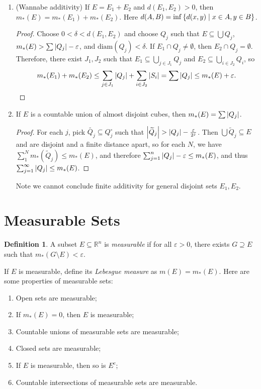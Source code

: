 \documentclass[leqno, openany]{memoir}
\theoremstyle{definition}
\newtheorem{defn}[thm]{Definition}
\theoremstyle{remark}
\theoremstyle{plain}
\theoremstyle{definition}
\theoremstyle{remark}
\newcommand{\R}{\mathbb{R}}
\newcommand{\ep}{\varepsilon}
\newcommand{\mr}[1]{\mathrm{#1}}
\newcommand{\wt}[1]{\widetilde{#1}}
\begin{document}
\begin{enumerate}
\begin{proof}
            Now $E \subseteq \bigcup G_j$ and $G = \bigcup G_j$, so 
            \[ m_*(G) \leq \sum \qty(\abs{Q_j} + \frac{\ep}{2^j}) \leq \sum \abs{Q_j} + \ep \leq m_*(E) + 2 \ep. \qedhere \]
        \end{proof}
    \item (Wannabe additivity) If $E = E_1 + E_2$ and $d(E_1, E_2) > 0$, then $m_*(E) = m_*(E_1) + m_*(E_2)$. Here $d(A,B) = \inf \qty{d(x,y) \mid x \in A, y \in B}$.
        \begin{proof}
            Choose $0 < \delta < d(E_1, E_2)$ and choose $Q_j$ such that $E \subseteq \bigcup Q_j$, $m_*(E) > \sum \abs{Q_j} - \ep$, and $\mr{diam}(Q_j) < \delta$. If $E_1 \cap Q_j \neq \emptyset$, then $E_2 \cap Q_j = \emptyset$. Therefore, there exist $J_1, J_2$ such that $E_1 \subseteq \bigcup_{j \in J_1} Q_j$ and $E_2 \subseteq \bigcup_{i \in J_2} Q_i$, so
            \[ m_*(E_1) + m_*(E_2) \leq \sum_{j \in J_1} \abs{Q_j} + \sum_{i \in J_2} \abs{S_i} = \sum \abs{Q_j} \leq m_*(E) + \ep. \qedhere \]
        \end{proof}
    \item If $E$ is a countable union of almost disjoint cubes, then $m_*(E) = \sum \abs{Q_j}$.
        \begin{proof}
            For each $j$, pick $\wt{Q_j} \subseteq Q_j^{\circ}$ such that $\abs{\wt{Q}_j} > \abs{Q_j} - \frac{\ep}{2^j}$. Then $\bigcup \wt{Q}_j \subseteq E$ and are disjoint and a finite distance apart, so for each $N$, we have $\sum_1^N m_*(\wt{Q}_j) \leq m_*(E)$, and therefore $\sum_{j=1}^n \abs{Q_j} - \ep \leq m_*(E)$, and thus $\sum_{j=1}^{\infty} \abs{Q_j} \leq m_*(E)$.
        \end{proof}
        Note we cannot conclude finite additivity for general disjoint sets $E_1, E_2$.
\end{enumerate}

\section{Measurable Sets}%
\label{sec:measurable_sets}

\begin{defn}
    A subset $E \subseteq \R^n$ is \textit{measurable} if for all $\ep > 0$, there exists $G \supseteq E$ such that $m_*(G \setminus E) < \ep$.
\end{defn}

If $E$ is measurable, define its \textit{Lebesgue measure} as $m(E) = m_*(E)$. Here are some properties of measurable sets:
\begin{enumerate}
    \item Open sets are measurable;
    \item If $m_*(E) = 0$, then $E$ is measurable;
    \item Countable unions of measurable sets are measurable;
    \item Closed sets are measurable;
    \item If $E$ is measurable, then so is $E^c$;
    \item Countable intersections of measurable sets are measurable.
\end{enumerate}
\end{document}
